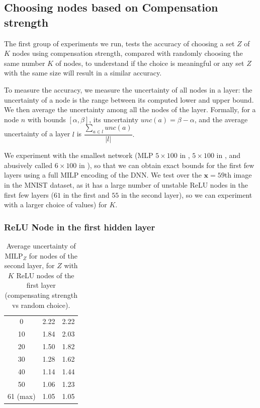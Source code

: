\documentclass{llncs}
\newcommand{\vx}{\boldsymbol{x}}
\newcommand{\MILP}{{\textrm{MILP}}}
\begin{document}
\subsection{Choosing nodes based on Compensation strength}

The first group of experiments we run, tests the accuracy of choosing a set $Z$ of $K$ nodes using compensation strength, compared with randomly choosing the same number $K$ of nodes, to understand if the choice is meaningful or any set $Z$ with the same size will result in a similar accuracy.

To measure the accuracy, we measure the uncertainty of all nodes in a layer:
the uncertainty of a node is the range between its computed lower and upper bound. 
We then average the uncertainty among all the nodes of the layer.
Formally, for a node $n$ with bounds $[\alpha,\beta]$, its uncertainty $unc(a) = \beta - \alpha$, and the average uncertainty of a layer $l$ is $\dfrac{\sum_{a\in l} unc(a)}{|l|}.$

We experiment with the smallest network (MLP $5\times 100$ in \cite{crown}, 
$5 \times 100$ in \cite{prima}, and abusively called $6 \times 100$ in \cite{deeppoly}), so that we can obtain exact bounds for the first few layers using a full MILP encoding of the DNN. We test over the $\vx=59$th image in the MNIST dataset, as it has a large number of unstable ReLU nodes in the first few layers ($61$ in the first and $55$ in the second layer), so we can experiment with a larger choice of values) for $K$.

\subsubsection*{ReLU Node in the first hidden layer}


\begin{table}[b!]
	\centering
	\begin{tabular}{|c||c|c|}
	\hline
	\text{Number $K$ of nodes in $Z$}  &  \text{Compensate strength} & \text{Random Choice}  \\ \hline
	\hline
	0  &  2.22 & 2.22  \\ \hline
	10  &  1.84 & 2.03  \\ \hline
	20  &  1.50 & 1.82  \\ \hline
	30  &  1.28 & 1.62  \\ \hline
	40  &  1.14 & 1.44  \\ \hline
	50  &  1.06 & 1.23  \\ \hline
	61 (max) & 1.05 &  1.05 \\ \hline
\end{tabular}
\caption{Average uncertainty of $\MILP_Z$ for nodes of the second layer, for $Z$ with $K$ ReLU nodes of the first layer (compensating strength vs random choice).}
\label{tab:example0}
\end{table}
\end{document}
